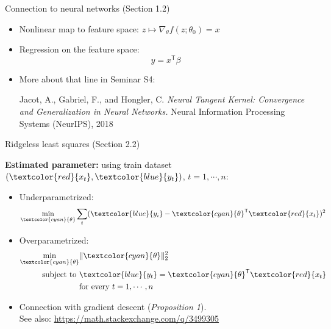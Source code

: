 \documentclass[english,aspectratio=1610]{beamer} %
\newcommand{\trnsp}{\mathsf{T}}
\begin{document}
\begin{frame}{Connection to neural networks (Section 1.2)}
\begin{itemize}
\item
Nonlinear map to feature space: $z \mapsto \nabla_\theta f(z; \theta_0) = x$
\item Regression on the feature space:
\begin{equation*}
y = x^\trnsp \beta
\end{equation*}

\item More about that line in Seminar S4:
\vspace{13pt}

\tiny{Jacot, A., Gabriel, F., and Hongler, C. \textit{Neural {Tangent} {Kernel}: {Convergence} and {Generalization} in
  {Neural} {Networks}.} Neural Information Processing Systems (NeurIPS), 2018}	

\end{itemize}
\end{frame}

\begin{frame}{Ridgeless least squares  (Section 2.2)}

\textbf{Estimated parameter:} using train dataset $(\textcolor{red}{x_t}, \textcolor{blue}{y_t})$, $t = 1, \cdots, n$:
\begin{itemize}
    \item<2-> Underparametrized:
    \begin{equation*}
       \min_{\textcolor{cyan}{\theta}} \sum_t (\textcolor{blue}{y_i} - \textcolor{cyan}{\theta}^\trnsp \textcolor{red}{x_t})^2
    \end{equation*}
    \item<3> Overparametrized:
        \begin{equation*}
        \begin{aligned}
            \min_{\textcolor{cyan}{\theta}} & \|\textcolor{cyan}{\theta}\|_2^2\\
             \text{subject to }& \textcolor{blue}{y_t} = \textcolor{cyan}{\theta}^\trnsp \textcolor{red}{x_t} \\
            & \text{for every } t = 1, \cdots, n
        \end{aligned}
    \end{equation*}
    \item<3> Connection with gradient descent (\textit{Proposition 1}). \\
    \scriptsize{ See also:
    \href{https://math.stackexchange.com/q/3499305}{https://math.stackexchange.com/q/3499305}}
\end{itemize}

\end{frame}
\end{document}
